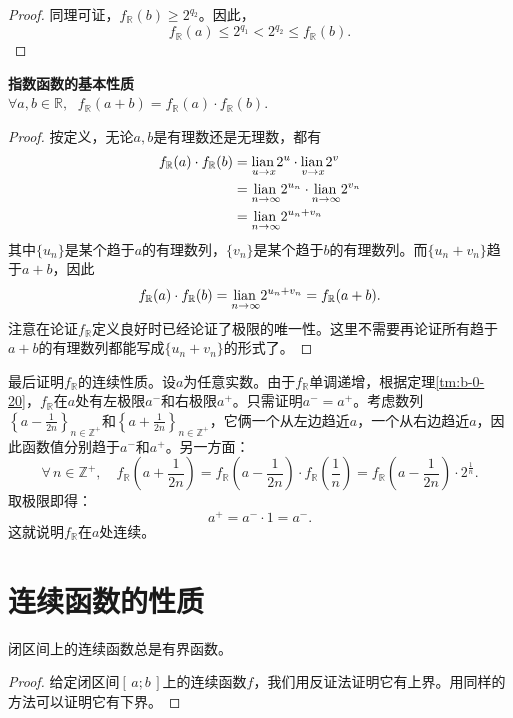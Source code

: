 \documentclass[12pt,UTF8,fontset=none]{ctexbook}
\begin{document}
\begin{appendix}
\begin{proof}
    同理可证，$f_{\mathbb{R}} (b)\geqslant 2^{q_2}$。因此，
    $$ f_{\mathbb{R}} (a)\leqslant 2^{q_1} < 2^{q_2} \leqslant f_{\mathbb{R}} (b). $$
\end{proof}

\begin{tm}{\textbf{指数函数的基本性质}}\\
    $ \forall a, b \in \mathbb{R}, \;\,\, f_{\mathbb{R}}(a + b) = f_{\mathbb{R}}(a) \cdot f_{\mathbb{R}}(b).$
\end{tm}

\begin{proof}
    按定义，无论$a,b$是有理数还是无理数，都有
    \begin{align*}
         f_{\mathbb{R}}(a) \cdot f_{\mathbb{R}}(b) &= \underset{u \to x}{\operatorname{lian}\,} 2^u \cdot \underset{v \to x}{\operatorname{lian}\,} 2^v \\
         &= \underset{n\to\infty}{\operatorname{lian}\,} 2^{u_n} \cdot \underset{n\to\infty}{\operatorname{lian}\,} 2^{v_n} \\
         &= \underset{n\to\infty}{\operatorname{lian}\,} 2^{u_n+v_n}
    \end{align*}
    其中$\{u_n\}$是某个趋于$a$的有理数列，$\{v_n\}$是某个趋于$b$的有理数列。而$\{u_n+v_n\}$趋于$a+b$，因此
    $$f_{\mathbb{R}}(a) \cdot f_{\mathbb{R}}(b) = \underset{n\to\infty}{\operatorname{lian}\,} 2^{u_n+v_n} = f_{\mathbb{R}}(a + b).$$
    注意在论证$f_{\mathbb{R}}$定义良好时已经论证了极限的唯一性。这里不需要再论证所有趋于$a+b$的有理数列都能写成$\{u_n+v_n\}$的形式了。
\end{proof}

最后证明$f_{\mathbb{R}}$的连续性质。设$a$为任意实数。由于$f_{\mathbb{R}}$单调递增，根据定理\ref{tm:b-0-20}，$f_{\mathbb{R}}$在$a$处有左极限$a^-$和右极限$a^+$。只需证明$a^-=a^+$。考虑数列$\left\{a-\frac{1}{2n}\right\}_{n\in \mathbb{Z}^+}$和$\left\{a+\frac{1}{2n}\right\}_{n\in \mathbb{Z}^+}$，它俩一个从左边趋近$a$，一个从右边趋近$a$，因此函数值分别趋于$a^-$和$a^+$。另一方面：
$$ \forall \, n\in \mathbb{Z}^+,\quad f_{\mathbb{R}} \left(a+\frac{1}{2n}\right) = f_{\mathbb{R}} \left(a - \frac{1}{2n}\right) \cdot f_{\mathbb{R}} \left(\frac{1}{n}\right) = f_{\mathbb{R}} \left(a - \frac{1}{2n}\right) \cdot  2^{\frac{1}{n}}.   $$
取极限即得：
$$ a^+ = a^- \cdot 1 = a^-.$$
这就说明$f_{\mathbb{R}}$在$a$处连续。


\section{连续函数的性质}

\begin{tm}\label{tm:b-1-0}
    闭区间上的连续函数总是有界函数。
\end{tm}
\begin{proof}
    给定闭区间$[\,a; b\,]$上的连续函数$f$，我们用反证法证明它有上界。用同样的方法可以证明它有下界。


\end{proof}
\end{appendix}
\end{document}
